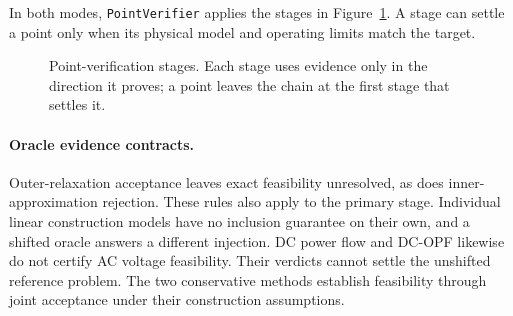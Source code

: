 \documentclass[11pt,a4paper]{report}
\newcommand{\code}[1]{\texttt{\small #1}}
\begin{document}
In both modes, \code{PointVerifier} applies the stages in
Figure~\ref{fig:escalation}. A stage can settle a point only when its physical
model and operating limits match the target.

\begin{figure}[htbp]
\centering
{}
\caption{Point-verification stages. Each stage uses evidence only in the
direction it proves; a point leaves the chain at the first stage that settles
it.}
\label{fig:escalation}
\end{figure}

\paragraph{Oracle evidence contracts.}
Outer-relaxation acceptance leaves exact feasibility unresolved, as does
inner-approximation rejection. These rules also apply to the primary stage.
Individual linear construction models have no inclusion
guarantee on their own, and a shifted oracle answers a different injection.
DC power flow and DC-OPF likewise do not certify AC voltage feasibility.
Their verdicts cannot settle the unshifted reference problem. The two
conservative methods establish feasibility through joint acceptance under
their construction assumptions.
\end{document}

